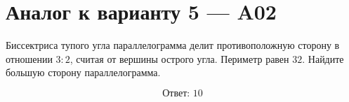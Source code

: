 


\section*{Аналог к варианту 5 — A02}
Биссектриса тупого угла параллелограмма делит противоположную сторону в отношении \(3:2\), считая от вершины острого угла. Периметр равен \(32\). Найдите большую сторону параллелограмма.
\begin{center}\figParallelogramBisector\end{center}
\[\boxed{\text{Ответ: }10}\]


